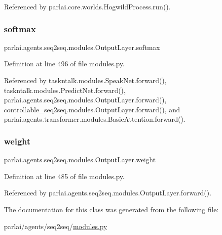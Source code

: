 Referenced by parlai.\+core.\+worlds.\+Hogwild\+Process.\+run().

\mbox{\label{classparlai_1_1agents_1_1seq2seq_1_1modules_1_1OutputLayer_ab2922db72cff29a3c4853dd25a464a93}} 
\subsubsection{\texorpdfstring{softmax}{softmax}}
{\footnotesize\ttfamily parlai.\+agents.\+seq2seq.\+modules.\+Output\+Layer.\+softmax}



Definition at line 496 of file modules.\+py.



Referenced by taskntalk.\+modules.\+Speak\+Net.\+forward(), taskntalk.\+modules.\+Predict\+Net.\+forward(), parlai.\+agents.\+seq2seq.\+modules.\+Output\+Layer.\+forward(), controllable\+\_\+seq2seq.\+modules.\+Output\+Layer.\+forward(), and parlai.\+agents.\+transformer.\+modules.\+Basic\+Attention.\+forward().

\mbox{\label{classparlai_1_1agents_1_1seq2seq_1_1modules_1_1OutputLayer_a7a1a9304974964821e1d4d73bdccec0a}} 
\subsubsection{\texorpdfstring{weight}{weight}}
{\footnotesize\ttfamily parlai.\+agents.\+seq2seq.\+modules.\+Output\+Layer.\+weight}



Definition at line 485 of file modules.\+py.



Referenced by parlai.\+agents.\+seq2seq.\+modules.\+Output\+Layer.\+forward().



The documentation for this class was generated from the following file\+:\begin{DoxyCompactItemize}
\item 
parlai/agents/seq2seq/\hyperlink{parlai_2agents_2seq2seq_2modules_8py}{modules.\+py}\end{DoxyCompactItemize}

